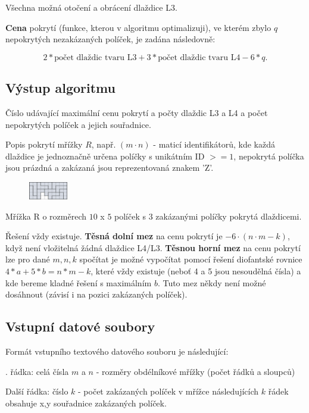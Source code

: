 \documentclass[]{article}
\begin{document}
 \noindent 
Všechna možná otočení a obrácení dlaždice L3.

\noindent
\textbf{Cena} pokrytí (funkce, kterou v algoritmu optimalizuji), ve kterém zbylo $q$ nepokrytých nezakázaných políček, je zadána následovně: 

$$ 2 * \text{počet dlaždic tvaru L3} + 3 * \text{počet dlaždic tvaru L4} - 6*q. $$

\subsection{Výstup algoritmu}

Číslo udávající maximální cenu pokrytí a počty dlaždic L3 a L4 a počet nepokrytých políček a jejich souřadnice.

\noindent
Popis pokrytí mřížky $R$, např. $(m \cdot n)$ - maticí identifikátorů, kde každá dlaždice je jednoznačně určena políčky 
s unikátním ID $>=1$, nepokrytá políčka jsou prázdná a zakázaná jsou reprezentovaná znakem 'Z'. 
    
\begin{figure}[H]\centering
	\includegraphics[width=0.15\textwidth]{img/l-example.jpg}
 	\label{obr3}
 \end{figure}

    
    \noindent
Mřížka R o rozměrech $10$ x $5$ políček s $3$ zakázanými políčky pokrytá dlaždicemi.

\noindent
Řešení vždy existuje.
\textbf{Těsná dolní mez} na cenu pokrytí je $- 6 \cdot( n \cdot m-k)$, když není vložitelná žádná dlaždice L4/L3.
\textbf{Těsnou horní mez} na cenu pokrytí lze pro dané $m,n,k$ spočítat je možné vypočítat pomocí řešení diofantské rovnice
$4*a+5*b=n*m-k$, které vždy existuje (neboť 4 a 5 jsou nesoudělná čísla) a kde bereme kladné řešení s maximálním $b$. Tuto mez někdy není možné dosáhnout (závisí i na pozici zakázaných políček).


\subsection{Vstupní datové soubory}


Formát vstupního textového datového souboru je následující:

. řádka: celá čísla $m$ a $n$ - rozměry obdélníkové mřížky (počet řádků a sloupců)

\noindent
Další řádka: číslo $k$ - počet zakázaných políček v mřížce
následujících $k$ řádek obsahuje x,y souřadnice zakázaných políček.
\end{document}
